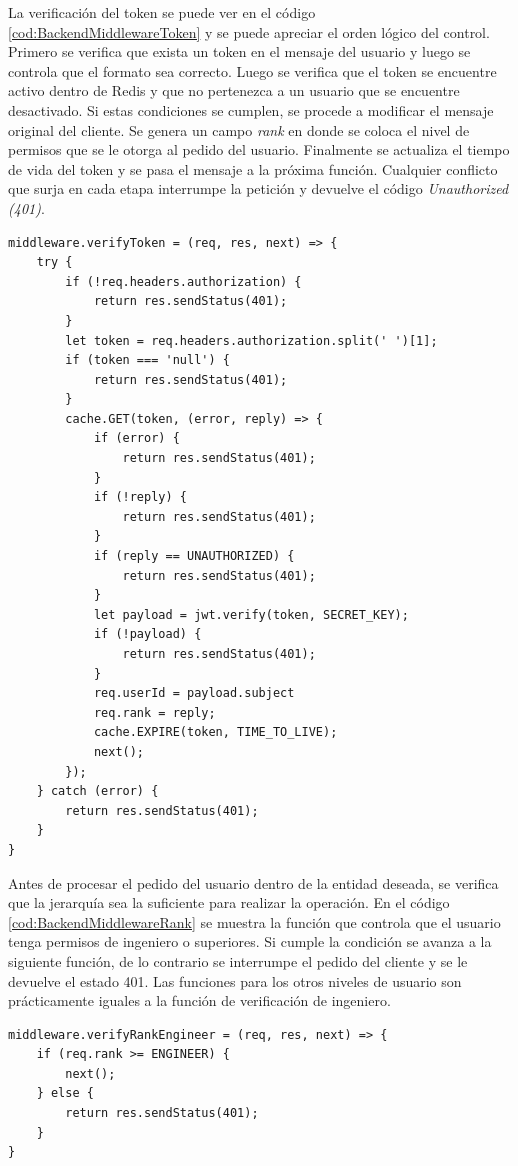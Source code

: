 La verificación del token se puede ver en el código \ref{cod:BackendMiddlewareToken} y se puede apreciar el orden lógico del control.
Primero se verifica que exista un token en el mensaje del usuario y luego se controla que el formato sea correcto.
Luego se verifica que el token se encuentre activo dentro de Redis y que no pertenezca a un usuario que se encuentre desactivado.
Si estas condiciones se cumplen, se procede a modificar el mensaje original del cliente.
Se genera un campo \emph{rank} en donde se coloca el nivel de permisos que se le otorga al pedido del usuario.
Finalmente se actualiza el tiempo de vida del token y se pasa el mensaje a la próxima función.
Cualquier conflicto que surja en cada etapa interrumpe la petición y devuelve el código \emph{Unauthorized (401)}.

\begin{lstlisting}[label=cod:BackendMiddlewareToken,caption=Verificación de token]
middleware.verifyToken = (req, res, next) => {
    try {
        if (!req.headers.authorization) {
            return res.sendStatus(401);
        }
        let token = req.headers.authorization.split(' ')[1];
        if (token === 'null') {
            return res.sendStatus(401);
        }
        cache.GET(token, (error, reply) => {
            if (error) {
                return res.sendStatus(401);
            }
            if (!reply) {
                return res.sendStatus(401);
            }
            if (reply == UNAUTHORIZED) {
                return res.sendStatus(401);
            }
            let payload = jwt.verify(token, SECRET_KEY);
            if (!payload) {
                return res.sendStatus(401);
            }
            req.userId = payload.subject
            req.rank = reply;
            cache.EXPIRE(token, TIME_TO_LIVE);
            next();
        });
    } catch (error) {
        return res.sendStatus(401);
    }
}
\end{lstlisting}

Antes de procesar el pedido del usuario dentro de la entidad deseada, se verifica que la jerarquía sea la suficiente para realizar la operación.
En el código \ref{cod:BackendMiddlewareRank} se muestra la función que controla que el usuario tenga permisos de ingeniero o superiores.
Si cumple la condición se avanza a la siguiente función, de lo contrario se interrumpe el pedido del cliente y se le devuelve el estado 401.
Las funciones para los otros niveles de usuario son prácticamente iguales a la función de verificación de ingeniero.

\begin{lstlisting}[label=cod:BackendMiddlewareRank,caption=Verificación de rango]
middleware.verifyRankEngineer = (req, res, next) => {
    if (req.rank >= ENGINEER) {
        next();
    } else {
        return res.sendStatus(401);
    }
}
\end{lstlisting}

